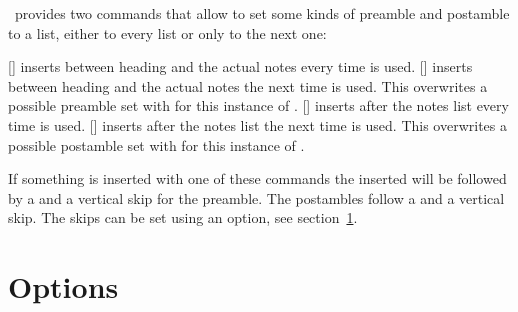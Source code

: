 \documentclass[load-preamble+]{cnltx-doc}
\begin{document}
\enotez\ provides two commands that allow to set some kinds of preamble and
postamble to a list, either to every list or only to the next one:
\begin{commands}
  []
    inserts  between heading and the actual notes
    every time  is used.
  []
     inserts  between heading and the actual
    notes the next time  is used.  This overwrites a
    possible preamble set with  for this instance of
    .
  []
     inserts  after the notes list every time
     is used.
  []
     inserts  after the notes list the next time
     is used.  This overwrites a possible postamble set with
     for this instance of .
\end{commands}
If something is inserted with one of these commands the inserted 
will be followed by a  and a vertical skip for the preamble.  The
postambles follow a  and a vertical skip.  The skips can be set using
an option, see section~\ref{sec:options}.

\section{Options}\label{sec:options}
\end{document}
